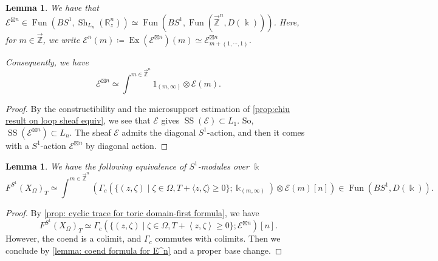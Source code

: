 \documentclass[11pt]{amsart}
\numberwithin{equation}{section}
\theoremstyle{plain}
\newtheorem{Lemma}[lemma]{Lemma}
\theoremstyle{definition}
\theoremstyle{remark}
\newcommand{\bR} { {\mathbb{R}}}
\newcommand{\cE} { {\mathcal{E}}}
\newcommand{\Sh} { {\operatorname{Sh}}}
\newcommand\Fun{\operatorname{Fun}}
\newcommand\ms{\operatorname{SS}}
\newcommand{\rarbZ} { \overrightarrow{\mathbb{Z}}}
\newcommand{\Ex}{\operatorname{Ex}}
\begin{document}
\begin{Lemma}\label{lemma: coend formula for E^n}We have that $\cE^{\boxtimes n} \in \Fun(BS^1,\Sh_{L_n}(\bR^n_z))\simeq \Fun(BS^1,\Fun(\rarbZ^n,D(\Bbbk)))$. Here, for $m\in \rarbZ$, we write $\cE^n(m)\coloneqq \Ex(\cE^{\boxtimes n})(m)\simeq \cE^{\boxtimes n}_{m+(1,\cdots,1)}$.

Consequently, we have
\[\cE^{\boxtimes n}\simeq \int^{m\in\rarbZ^n} 1_{(m,\infty)}\otimes \cE(m) .\]    
\end{Lemma}
\begin{proof}By the constructibility and the microsupport estimation of \autoref{prop:chiu result on loop sheaf equiv}, we see that $\cE$  gives $\ms(\cE)\subset L_1$. So, $\ms(\cE^{\boxtimes n})\subset L_n$.  The sheaf $\cE$ admits the diagonal $S^1$-action, and then it comes with a $S^1$-action $\cE^{\boxtimes n}$ by diagonal action.
\end{proof}


\begin{Lemma}\label{lemma: cyclic trace coend second}We have the following equivalence of $S^1$-modules over $\Bbbk$
\[
F^{S^1}(X_\Omega)_{T}\simeq \int^{m\in\rarbZ^n}\left(\Gamma_c\left({\{(z,\zeta)\mid \zeta\in \Omega, T+\langle z,\zeta\rangle \geq 0\}};\Bbbk_{(m,\infty)}\right)\otimes \cE(m)[n]\right)\in \Fun(BS^1,D(\Bbbk)).
\]
\end{Lemma}
\begin{proof}By \autoref{prop: cyclic trace for toric domain-first formula}, we have 
\[F^{S^1}(X_\Omega)_T \simeq \Gamma_c(\{(z, \zeta) \mid \zeta \in \Omega, T + \left<z, \zeta \right> \geq 0\}; \cE^{\boxtimes n})[n].\]
However, the coend is a colimit, and $\Gamma_c$ commutes with colimits. Then we conclude by \autoref{lemma: coend formula for E^n} and a proper base change.
\end{proof}
\end{document}
